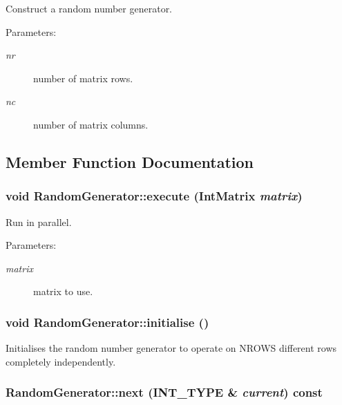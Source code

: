 Construct a random number generator. \begin{Desc}
\item[Parameters:]
\begin{description}
\item[{\em nr}]number of matrix rows. \item[{\em nc}]number of matrix columns. \end{description}
\end{Desc}


\subsection{Member Function Documentation}
\hypertarget{class_random_generator_4c5ae77662dfca92b1677e36b124e3c4}{
\subsubsection[{execute}]{\setlength{\rightskip}{0pt plus 5cm}void RandomGenerator::execute ({\bf IntMatrix} {\em matrix})}}
\label{class_random_generator_4c5ae77662dfca92b1677e36b124e3c4}


Run in parallel. \begin{Desc}
\item[Parameters:]
\begin{description}
\item[{\em matrix}]matrix to use. \end{description}
\end{Desc}
\hypertarget{class_random_generator_8a8390ed7e511770795cf4204d1f1df0}{
\subsubsection[{initialise}]{\setlength{\rightskip}{0pt plus 5cm}void RandomGenerator::initialise ()}}
\label{class_random_generator_8a8390ed7e511770795cf4204d1f1df0}


Initialises the random number generator to operate on NROWS different rows completely independently. \hypertarget{class_random_generator_caea6ecf8e980861f1d370cb54eaeeda}{
\subsubsection[{next}]{ RandomGenerator::next ({\bf INT\_\-TYPE} \& {\em current}) const}}
\label{class_random_generator_caea6ecf8e980861f1d370cb54eaeeda}


